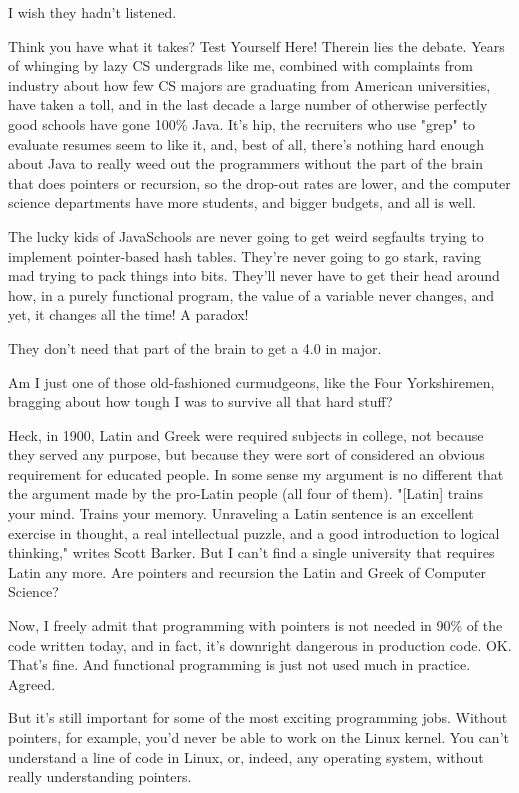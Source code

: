 \documentclass[11pt]{article}
\begin{document}
I wish they hadn't listened.

Think you have what it takes? Test Yourself Here! Therein lies the debate. Years
of whinging by lazy CS undergrads like me, combined with complaints from
industry about how few CS majors are graduating from American universities, have
taken a toll, and in the last decade a large number of otherwise perfectly good
schools have gone 100\% Java. It's hip, the recruiters who use "grep" to evaluate
resumes seem to like it, and, best of all, there's nothing hard enough about
Java to really weed out the programmers without the part of the brain that does
pointers or recursion, so the drop-out rates are lower, and the computer science
departments have more students, and bigger budgets, and all is well.

The lucky kids of JavaSchools are never going to get weird segfaults trying to
implement pointer-based hash tables. They're never going to go stark, raving mad
trying to pack things into bits. They'll never have to get their head around
how, in a purely functional program, the value of a variable never changes, and
yet, it changes all the time! A paradox!

They don't need that part of the brain to get a 4.0 in major.

Am I just one of those old-fashioned curmudgeons, like the Four Yorkshiremen,
bragging about how tough I was to survive all that hard stuff?

Heck, in 1900, Latin and Greek were required subjects in college, not because
they served any purpose, but because they were sort of considered an obvious
requirement for educated people. In some sense my argument is no different that
the argument made by the pro-Latin people (all four of them). "[Latin] trains
your mind. Trains your memory. Unraveling a Latin sentence is an excellent
exercise in thought, a real intellectual puzzle, and a good introduction to
logical thinking," writes Scott Barker. But I can't find a single university
that requires Latin any more. Are pointers and recursion the Latin and Greek of
Computer Science?

Now, I freely admit that programming with pointers is not needed in 90\% of the
code written today, and in fact, it's downright dangerous in production code.
OK. That's fine. And functional programming is just not used much in practice.
Agreed.

But it's still important for some of the most exciting programming jobs. Without
pointers, for example, you'd never be able to work on the Linux kernel. You
can't understand a line of code in Linux, or, indeed, any operating system,
without really understanding pointers.
\end{document}
